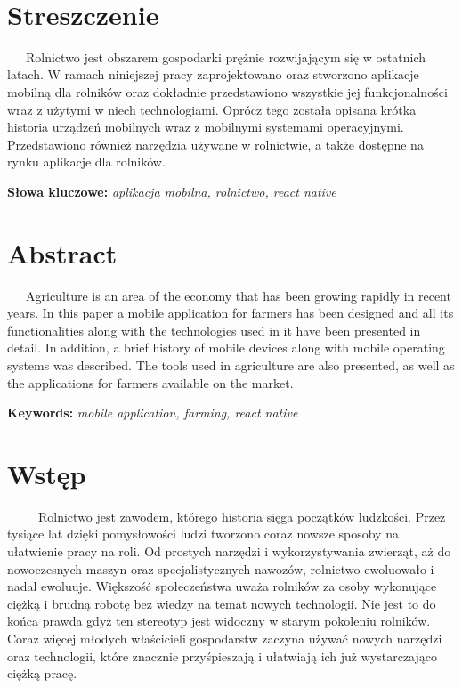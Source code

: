 \documentclass[a4paper,12pt,oneside]{book}
\begin{document}
	\thispagestyle{empty}
	
	
	\newpage
	\thispagestyle{empty}
	\
	
	\newpage
	\thispagestyle{empty}
	\chapter*{Streszczenie}
		\ \ \ Rolnictwo jest obszarem gospodarki prężnie rozwijającym się w ostatnich latach. W ramach niniejszej pracy zaprojektowano oraz stworzono aplikacje mobilną dla rolników oraz dokładnie przedstawiono wszystkie jej funkcjonalności wraz z użytymi w niech technologiami. Oprócz tego została opisana krótka historia urządzeń mobilnych wraz z mobilnymi systemami operacyjnymi. Przedstawiono również narzędzia używane w rolnictwie, a także dostępne na rynku aplikacje dla rolników.
			
		\textbf{Słowa kluczowe:} \textit{aplikacja mobilna, rolnictwo, react native}
	
		\newpage
	\thispagestyle{empty}
	\chapter*{Abstract}
		\ \ \ Agriculture is an area of the economy that has been growing rapidly in recent years. In this paper a mobile application for farmers has been designed and all its functionalities along with the technologies used in it have been presented in detail. In addition, a brief history of mobile devices along with mobile operating systems was described. The tools used in agriculture are also presented, as well as the applications for farmers available on the market.
		
		\textbf{Keywords:} \textit{mobile application, farming, react native}
	
	\newpage
	\thispagestyle{empty} %
	\tableofcontents %
	
	\newpage
	\thispagestyle{empty}
	\chapter*{Wstęp} %
	
		\ \ \ \ \ Rolnictwo jest zawodem, którego historia sięga początków ludzkości. Przez tysiące lat dzięki pomysłowości ludzi tworzono coraz nowsze sposoby na ułatwienie pracy na roli. Od prostych narzędzi i wykorzystywania zwierząt, aż do nowoczesnych maszyn oraz specjalistycznych nawozów, rolnictwo ewoluowało i nadal ewoluuje. Większość społeczeństwa uważa rolników za osoby wykonujące ciężką i brudną robotę bez wiedzy na temat nowych technologii. Nie jest to do końca prawda gdyż ten stereotyp jest widoczny w starym pokoleniu rolników. Coraz więcej młodych właścicieli gospodarstw zaczyna używać nowych narzędzi oraz technologii, które znacznie przyśpieszają i ułatwiają ich już wystarczająco ciężką pracę.
		
\end{document}
